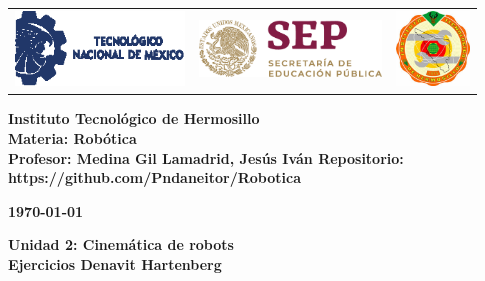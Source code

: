 \begin{titlepage}
	\centering
	\begin{tabular}{@{}p{} p{} p{}@{}}
		\includegraphics[height=2cm]{tecnm} & 
		\centering \includegraphics[height=1.5cm]{SEP} & 
		\raggedleft \includegraphics[height=2cm]{ith.jpg} \\
	\end{tabular}
	
	\vspace{2em}
	
	\noindent
	\begin{minipage}[t]{0.48\textwidth}
		\raggedright
		\small \textbf{%
			Instituto Tecnológico de Hermosillo\\
			Materia: Robótica\\
			Profesor: Medina Gil Lamadrid, Jesús Iván
			Repositorio: https://github.com/Pndaneitor/Robotica%
		}
	\end{minipage}%
	\hfill
	\begin{minipage}[t]{0.48\textwidth}
		\raggedleft
		\small \textbf{\today}
	\end{minipage}
	
	\vspace{2em}
	
	{\large \textbf{Unidad 2: Cinemática de robots}}\\
		\vspace{1em}
	{\Huge \textbf{Ejercicios Denavit Hartenberg
}}
		

\end{titlepage}
